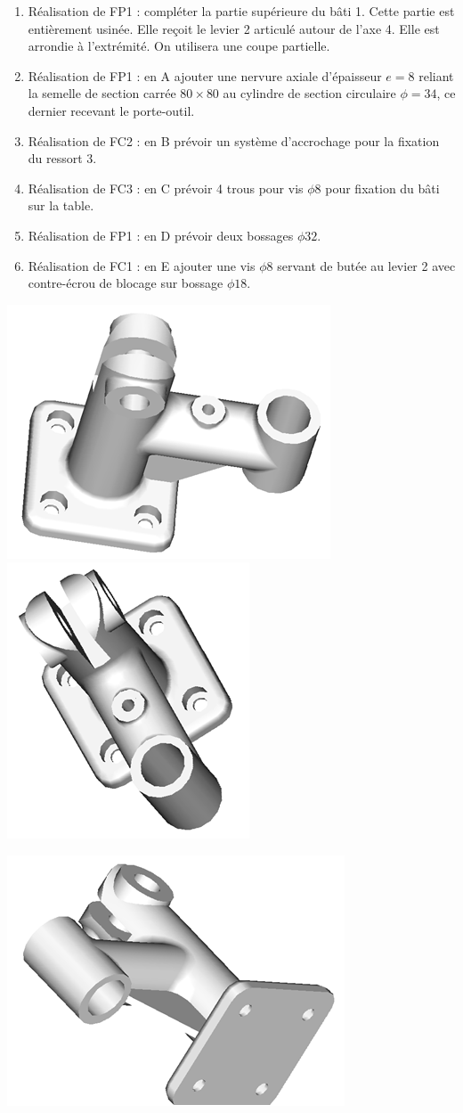 \documentclass[11pt,oneside]{article}
\begin{document}
\begin{enumerate}
\item Réalisation de FP1 : compléter la partie supérieure du bâti 1. Cette partie est entièrement usinée. Elle reçoit le levier 2 articulé autour de l'axe 4. Elle est arrondie à l'extrémité. On utilisera une coupe partielle.

\item Réalisation de FP1 : en A ajouter une nervure axiale d'épaisseur $e=8$ reliant la semelle de section carrée $80 \times 80$ au cylindre de section circulaire $\phi=34$, ce dernier recevant le porte-outil.

\item Réalisation de FC2 : en B prévoir un système d'accrochage pour la fixation du ressort 3.

\item Réalisation de FC3 : en C prévoir 4 trous pour vis $\phi 8$ pour fixation du bâti sur la table.

\item Réalisation de FP1 : en D prévoir deux bossages $\phi 32$.

\item Réalisation de FC1 : en E ajouter une vis $\phi 8$ servant de butée au levier 2 avec contre-écrou de blocage sur bossage $\phi 18$.
\end{enumerate}

\begin{center}
\includegraphics[width=.4\linewidth]{png/vue1}
\includegraphics[width=.4\linewidth]{png/vue2}
\end{center}

\begin{center}
\includegraphics[width=.4\linewidth]{png/vue3}
\end{center}
\end{document}
